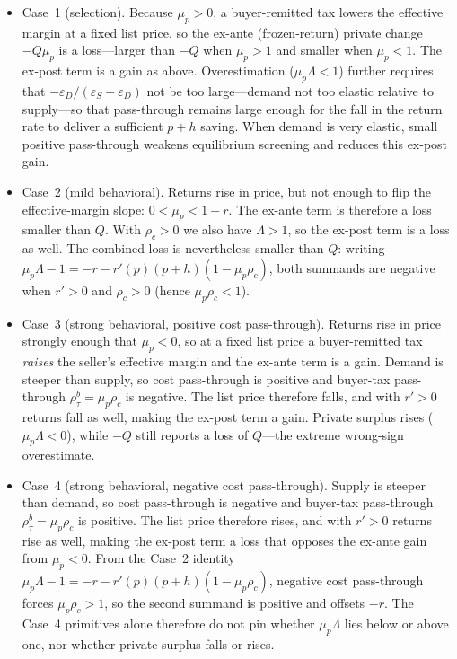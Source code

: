 \documentclass[11pt]{article}
\begin{document}
\begin{itemize}
  \item Case~1 (selection).  Because $\mu_p>0$, a buyer-remitted tax lowers
  the effective margin at a fixed list price, so the ex-ante
  (frozen-return) private change $-Q\mu_p$ is a loss---larger than $-Q$ when
  $\mu_p>1$ and smaller when $\mu_p<1$.  The ex-post term is a gain as above.
  Overestimation ($\mu_p\Lambda<1$) further requires that
  $-\varepsilon_D/(\varepsilon_S-\varepsilon_D)$ not be too large---demand
  not too elastic relative to supply---so that pass-through remains large
  enough for the fall in the return rate to deliver a sufficient $p+h$
  saving.  When demand is very elastic, small positive pass-through weakens
  equilibrium screening and reduces this ex-post gain.
  \item Case~2 (mild behavioral).  Returns rise in price, but not enough to
  flip the effective-margin slope: $0<\mu_p<1-r$.  The ex-ante term is
  therefore a loss smaller than $Q$.  With $\rho_c>0$ we also have
  $\Lambda>1$, so the ex-post term is a loss as well.  The combined loss is
  nevertheless smaller than $Q$: writing
  $\mu_p\Lambda-1=-r-r'(p)(p+h)(1-\mu_p\rho_c)$,
  both summands are negative when $r'>0$ and $\rho_c>0$
  (hence $\mu_p\rho_c<1$).
  \item Case~3 (strong behavioral, positive cost pass-through).
  Returns rise in price strongly enough that $\mu_p<0$, so at a fixed
  list price a buyer-remitted tax \emph{raises} the seller's effective
  margin and the ex-ante term is a gain.  Demand is steeper than supply, so
  cost pass-through is positive and buyer-tax pass-through
  $\rho^b_\tau=\mu_p\rho_c$ is negative.  The list price therefore falls,
  and with $r'>0$ returns fall as well, making the ex-post term a gain.
  Private surplus rises ($\mu_p\Lambda<0$), while $-Q$ still reports a loss
  of $Q$---the extreme wrong-sign overestimate.
  \item Case~4 (strong behavioral, negative cost pass-through).
  Supply is steeper than demand, so cost pass-through is negative and
  buyer-tax pass-through $\rho^b_\tau=\mu_p\rho_c$ is positive.  The
  list price therefore rises, and with $r'>0$ returns rise as well,
  making the ex-post term a loss that opposes the ex-ante gain from
  $\mu_p<0$.  From the Case~2 identity
  $\mu_p\Lambda-1=-r-r'(p)(p+h)(1-\mu_p\rho_c)$,
  negative cost pass-through forces $\mu_p\rho_c>1$, so the second summand
  is positive and offsets $-r$.  The Case~4 primitives alone therefore do
  not pin whether $\mu_p\Lambda$ lies below or above one, nor whether
  private surplus falls or rises.
\end{itemize}
\end{document}

